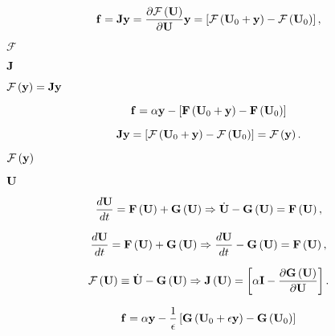 \documentclass{article}
\begin{document}
\begin{equation} {\bf f} = {\bf J}{\bf y} = \frac {\partial \mathcal{F}\left({\bf U}\right)} {\partial {\bf U}} {\bf y} = \left[ \mathcal{F}\left({\bf U}_0+{\bf y}\right)-\mathcal{F}\left({\bf U}_0\right) \right], \end{equation}
\pagebreak

$\mathcal{F}$
\pagebreak

${\bf J}$
\pagebreak

$\mathcal{F}\left({\bf y}\right) = {\bf J}{\bf y}$
\pagebreak

\begin{equation} {\bf f} = \alpha {\bf y} - \left[ {\bf F}\left({\bf U}_0+{\bf y}\right)-{\bf F}\left({\bf U}_0\right) \right] \end{equation}
\pagebreak

\begin{equation} {\bf J}{\bf y} = \left[ \mathcal{F}\left({\bf U}_0+{\bf y}\right)-\mathcal{F}\left({\bf U}_0\right) \right] = \mathcal{F}\left({\bf y}\right). \end{equation}
\pagebreak

$\mathcal{F}\left({\bf y}\right)$
\pagebreak

$\bf U$
\pagebreak

\begin{equation} \frac {d{\bf U}}{dt} = {\bf F}\left({\bf U}\right) + {\bf G}\left({\bf U}\right) \Rightarrow \dot{\bf U} - {\bf G}\left({\bf U}\right) = {\bf F}\left({\bf U}\right), \end{equation}
\pagebreak

\begin{equation} \frac {d {\bf U}} {dt} = {\bf F}\left({\bf U}\right) + {\bf G}\left({\bf U}\right) \Rightarrow \frac {d {\bf U}} {dt} - {\bf G}\left({\bf U}\right) = {\bf F}\left({\bf U}\right), \end{equation}
\pagebreak

\begin{equation} \mathcal{F}\left({\bf U}\right) \equiv \dot{\bf U} - {\bf G}\left({\bf U}\right) \Rightarrow {\bf J}\left({\bf U}\right) = \left[\alpha{\bf I} - \frac {\partial {\bf G}\left({\bf U}\right)} {\partial {\bf U}} \right]. \end{equation}
\pagebreak

\begin{equation} {\bf f} = \alpha {\bf y} - \frac{1}{\epsilon} \left[ {\bf G}\left({\bf U}_0+\epsilon{\bf y}\right)-{\bf G}\left({\bf U}_0\right) \right] \end{equation}
\pagebreak
\end{document}
